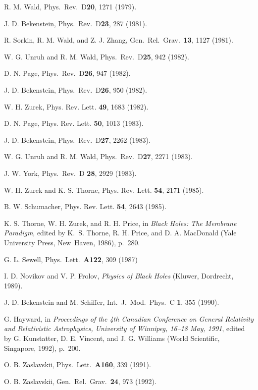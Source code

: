 \documentclass[12pt]{article}
\begin{document}
\begin{thebibliography}{999}
 R. M. Wald, Phys.\ Rev.\ D{\bf 20}, 1271 (1979).

 J. D. Bekenstein, Phys.\ Rev.\ D{\bf 23}, 287 (1981).

 R. Sorkin, R. M. Wald, and Z. J. Zhang, Gen.\ Rel.\
Grav.\ {\bf 13}, 1127 (1981).

 W. G. Unruh and R. M. Wald, Phys.\ Rev.\ D{\bf 25},
942 (1982).

 D. N. Page, Phys.\ Rev.\ D{\bf 26}, 947 (1982).

 J. D. Bekenstein, Phys.\ Rev.\ D{\bf 26}, 950 (1982).

 W. H. Zurek, Phys. Rev. Lett. {\bf 49}, 1683 (1982).

 D. N. Page, Phys. Rev. Lett. {\bf 50}, 1013 (1983).

 J. D. Bekenstein, Phys.\ Rev.\ D{\bf 27}, 2262
(1983).

 W. G. Unruh and R. M. Wald, Phys.\ Rev.\ D{\bf 27},
2271
(1983).

 J. W. York, Phys.\ Rev.\ D {\bf 28}, 2929 (1983).

 W. H. Zurek and K. S. Thorne, Phys. Rev. Lett. {\bf
54},
2171
 (1985).

 B. W. Schumacher, Phys. Rev. Lett. {\bf 54}, 2643
(1985).

 K. S. Thorne, W. H. Zurek, and R. H. Price,
 in {\em Black Holes: The Membrane
 Paradigm}, edited by K.~S. Thorne, R. H. Price, and D. A. MacDonald
(Yale University Press, New~Haven, 1986), p.~280.

 G. L. Sewell, Phys.\ Lett.\ {\bf A122}, 309 (1987)

 I. D. Novikov and V. P. Frolov, {\em Physics of
Black
 Holes} (Kluwer, Dordrecht, 1989).

 J. D. Bekenstein and M. Schiffer, Int.\ J.\ Mod.\
Phys.\ C {\bf 1}, 355 (1990).

 G. Hayward, in {\em Proceedings of the 4th
Canadian Conference on General Relativity and Relativistic
Astrophysics, University of Winnipeg, 16--18 May, 1991},
edited by G. Kunstatter, D. E. Vincent, and J. G. Williams
(World Scientific, Singapore, 1992), p.~200.

 O. B. Zaslavskii, Phys.\ Lett.\ {\bf A160}, 339
(1991).

 O. B. Zaslavskii, Gen.\ Rel.\ Grav.\ {\bf 24}, 973
(1992).


\end{thebibliography}
\end{document}
